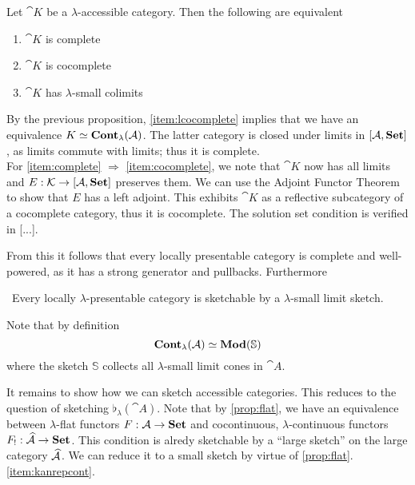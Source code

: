 \begin{Corollary}
Let $\cat K$ be a $\lambda$-accessible category. Then the following are equivalent
\begin{enumerate}
\item $\cat K$ is complete \label{item:complete}
\item $\cat K$ is cocomplete \label{item:cocomplete}
\item $\cat K$ has $\lambda$-small colimits \label{item:lcocomplete}
\end{enumerate}
\end{Corollary}
\begin{Proof}
By the previous proposition, \ref{item:lcocomplete} implies that we have an equivalence $K \simeq \mathbf{Cont}_\lambda(\mathcal{A})$. The latter category is closed under limits in $[\mathcal{A},\mathbf{Set}]$, as limits commute with limits; thus it is complete. \\

For \ref{item:complete} $\Rightarrow$ \ref{item:cocomplete}, we note that $\cat K$ now has all limits and $E : \mathcal{K} \to [\mathcal{A},\mathbf{Set}]$ preserves them. We can use the Adjoint Functor Theorem to show that $E$ has a left adjoint. This exhibits $\cat K$ as a reflective subcategory of a cocomplete category, thus it is cocomplete. The solution set condition is verified in [...]. 
\end{Proof}

From this it follows that every locally presentable category is complete and well-powered, as it has a strong generator and pullbacks. Furthermore

\begin{Corollary}\
Every locally $\lambda$-presentable category is sketchable by a $\lambda$-small limit sketch.
\end{Corollary}
\begin{Proof}
Note that by definition
\[ \mathbf{Cont}_\lambda(\mathcal{A}) \simeq \mathbf{Mod}(\mathbb S) \]
where the sketch $\mathbb S$ collects all $\lambda$-small limit cones in $\cat A$.
\end{Proof}

It remains to show how we can sketch accessible categories. This reduces to the question of sketching $\flat_\lambda(\cat A)$. Note that by \ref{prop:flat}, we have an equivalence between $\lambda$-flat functors $F : \mathcal{A} \to \mathbf{Set}$ and cocontinuous, $\lambda$-continuous functors $F_! : \widehat{\mathcal{A}} \to \mathbf{Set}$. This condition is alredy sketchable by a ``large sketch'' on the large category $\widehat{\mathcal{A}}$. We can reduce it to a small sketch by virtue of \ref{prop:flat}.\ref{item:kanrepcont}. \\


